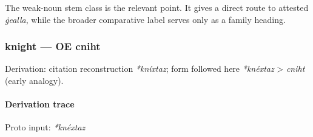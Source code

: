 \documentclass[
  british,
  a4paper,
]{article}
\begin{document}
The weak-noun stem class is the relevant point. It gives a direct route
to attested \emph{ġealla}, while the broader comparative label serves
only as a family heading.

\subsubsection{knight --- OE cniht}\label{knight-oe-cniht}

Derivation: citation reconstruction \emph{*kníxtaz}; form followed here
\emph{*knéxtaz} \textgreater{} \emph{cniht} (early analogy).

\paragraph{Derivation trace}\label{derivation-trace-13}

Proto input: \emph{*knéxtaz}

\begingroup
\setlength{\fboxsep}{6pt}
\end{document}
